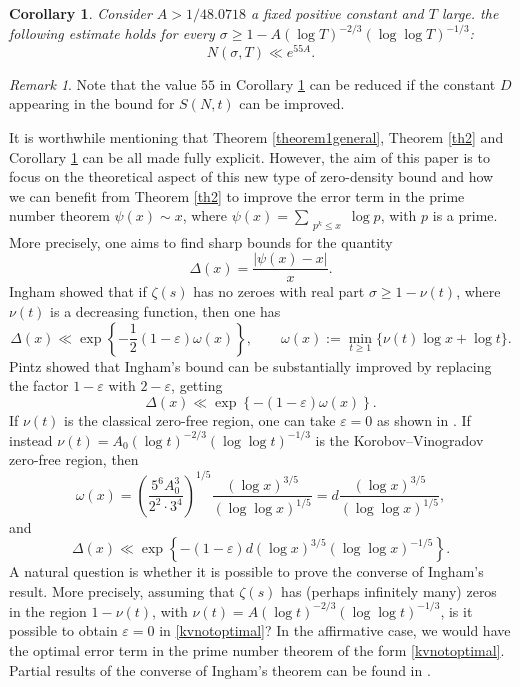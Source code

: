 \documentclass[reqno]{amsart}
\newtheorem{corollary}[theorem]{Corollary}
\numberwithin{equation}{section}
\theoremstyle{remark}
\newtheorem*{remark}{Remark}
\begin{document}
\begin{corollary}\label{cor3}
    Consider $A>1/48.0718$ a fixed positive constant and $T$ large. the following estimate holds for every $\sigma\ge 1-A(\log T)^{-2/3}(\log\log T)^{-1/3}$:
    \[
    N(\sigma,T)\ll e^{55A}.
    \]
\end{corollary}
\begin{remark}
    Note that the value $55$ in Corollary \ref{cor3} can be reduced if the constant $D$ appearing in the bound for $S(N,t)$ can be improved.
\end{remark}
It is worthwhile mentioning that Theorem \ref{theorem1general}, Theorem \ref{th2} and Corollary \ref{cor3} can be all made fully explicit. However, the aim of this paper is to focus on the theoretical aspect of this new type of zero-density bound and how we can benefit from Theorem \ref{th2} to improve the error term in the prime number theorem $\psi(x)\sim x$, where $\psi(x)=\sum_{\substack{p^k \leq x}} \log p$, with $p$ is a prime. More precisely, one aims to find sharp bounds for the quantity
\begin{equation}\label{Delta}
    \Delta(x)=\frac{|\psi(x)-x|}{x}.
\end{equation}
Ingham \cite{ingham1932distribution}  showed that if $\zeta(s)$ has no zeroes with real part $\sigma \geq 1-\nu(t)$, where $\nu(t)$ is a decreasing function, then one has
$$
\Delta(x) \ll \exp \left\{-\frac{1}{2}(1-\varepsilon) \omega(x)\right\},\qquad \omega(x):=\min _{t \geq 1}\{\nu(t) \log x+\log t\}.
$$
Pintz \cite{pintz80} showed that Ingham's bound can be substantially improved by replacing the factor $1-\varepsilon$ with $2-\varepsilon$, getting
$$
\Delta(x) \ll \exp \left\{-(1-\varepsilon) \omega(x)\right\}.
$$
If $\nu(t)$ is the classical zero-free region, one can take $\varepsilon=0$ as shown in \cite{johnston2024zerodensityestimatesoptimalityerror}. If instead $\nu(t)=A_0(\log t)^{-2/3}(\log\log t)^ {-1/3}$ is the Korobov--Vinogradov zero-free region, then
\begin{equation}\label{defomega}
    \omega(x)=\left(\frac{5^6A_0^3}{2^2 \cdot 3^4 }\right)^{1 / 5} \frac{(\log x)^{3 / 5}}{(\log \log x)^{1 / 5}}=d \frac{(\log x)^{3 / 5}}{(\log \log x)^{1 / 5}},
\end{equation}
and
\begin{equation}\label{kvnotoptimal}
    \Delta(x) \ll \exp \left\{-(1-\varepsilon)d (\log x)^{3/5}(\log\log x)^{-1/5}\right\}.
\end{equation}
A natural question is whether it is possible to prove the converse of Ingham's result. More precisely, assuming that $\zeta(s)$ has (perhaps infinitely many) zeros in the region $1-\nu (t)$, with $\nu(t)=A(\log t)^{-2/3}(\log\log t)^ {-1/3}$, is it possible to obtain $\varepsilon=0$ in \eqref{kvnotoptimal}? In the affirmative case, we would have the optimal error term in the prime number theorem of the form \eqref{kvnotoptimal}. Partial results of the converse of Ingham's theorem can be found in \cite{stas_uber_1961, pintz80}.
\end{document}
